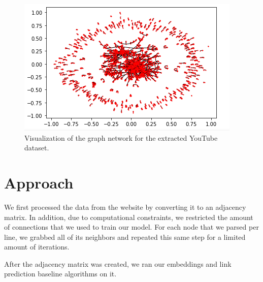 \documentclass[10pt,twocolumn,letterpaper]{article}
\begin{document}
\begin{figure}[t]
\begin{center}
   \includegraphics[width=1\linewidth]{latex/images/graph-viz.PNG}
\end{center}
   \caption{Visualization of the graph network for the extracted YouTube dataset.}
\label{fig:long}
\label{fig:onecol}
\end{figure}
\section{Approach}
We first processed the data from the website by converting it to an adjacency matrix. In addition, due to computational constraints, we restricted the amount of connections that we used to train our model. For each node that we parsed per line, we grabbed all of its neighbors and repeated this same step for a limited amount of iterations.

After the adjacency matrix was created, we ran our embeddings and link prediction baseline algorithms on it.



\end{document}
